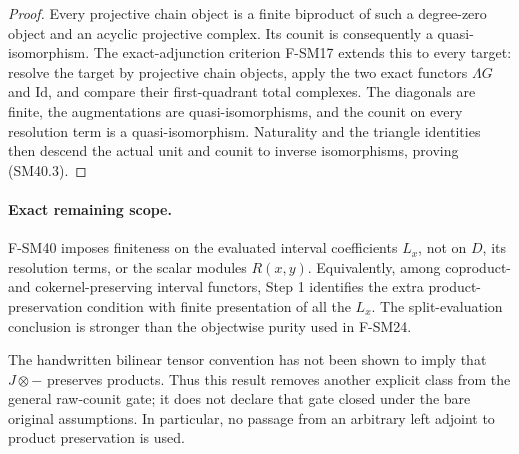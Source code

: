 \begin{proof}
Every projective chain object is a finite biproduct of
such a degree-zero object and an acyclic projective
complex.  Its counit is consequently a quasi-isomorphism.
The exact-adjunction criterion F-SM17 extends this to
every target: resolve the target by projective chain
objects, apply the two exact functors \(\Lambda G\) and
\(\mathrm{Id}\), and compare their first-quadrant total
complexes.  The diagonals are finite, the augmentations
are quasi-isomorphisms, and the counit on every resolution
term is a quasi-isomorphism.  Naturality and the triangle
identities then descend the actual unit and counit to
inverse isomorphisms, proving (SM40.3).
\end{proof}

\paragraph{Exact remaining scope.}
F-SM40 imposes finiteness on the evaluated interval
coefficients \(L_x\), not on \(D\), its resolution terms,
or the scalar modules \(R(x,y)\).  Equivalently, among
coproduct- and cokernel-preserving interval functors,
Step 1 identifies the extra product-preservation condition
with finite presentation of all the \(L_x\).
The split-evaluation conclusion is stronger than the
objectwise purity used in F-SM24.

The handwritten bilinear tensor convention has not been
shown to imply that \(J\otimes-\) preserves products.
Thus this result removes another explicit class from
the general raw-counit gate; it does not declare that
gate closed under the bare original assumptions.
In particular, no passage from an arbitrary left adjoint
to product preservation is used.
